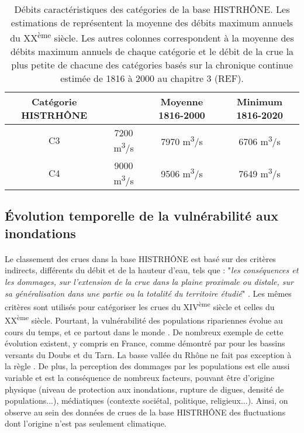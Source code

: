 \documentclass[11pt]{article}
\begin{document}
	\begin{table}[h]
	\centering
	\caption{Débits caractéristiques des catégories de la base HISTRHÔNE. Les estimations de \citet{pichard_hydro-climatology_2017} représentent la moyenne des débits maximum annuels du XX\textsuperscript{ème} siècle. Les autres colonnes correspondent à la moyenne des débits maximum annuels de chaque catégorie et le débit de la crue la plus petite de chacune des catégories basés sur la chronique continue estimée de 1816 à 2000 au chapitre 3 (REF).} 
	\label{tab:Qcateg}
		\begin{tabular}{|c|c|c|c|}
		\hline
		Catégorie HISTRHÔNE & \citet{pichard_hydro-climatology_2017} & Moyenne 1816-2000 & Minimum 1816-2020\\ \hline
		C3  & 7200 m\textsuperscript{3}/s  & 7970 m\textsuperscript{3}/s    & 6706 m\textsuperscript{3}/s   \\ \hline
		C4  & 9000 m\textsuperscript{3}/s  & 9506 m\textsuperscript{3}/s    & 7649 m\textsuperscript{3}/s   \\ \hline
		\end{tabular}
	\end{table}
	
	\subsection{Évolution temporelle de la vulnérabilité aux inondations}
	\label{subsec:EvolVuln}
	
	\paragraph{} Le classement des crues dans la base HISTRHÔNE est basé sur des critères indirects, différents du débit et de la hauteur d'eau, tels que : "\textit{les conséquences et les dommages, sur l'extension de la crue dans la plaine proximale ou distale, sur sa généralisation dans une partie ou la totalité du territoire étudié}" \citep{pichard_sept_2014}. Les mêmes critères sont utilisés pour catégoriser les crues du XIV\textsuperscript{ème} siècle et celles du XX\textsuperscript{ème} siècle. Pourtant, la vulnérabilité des populations ripariennes évolue au cours du temps, et ce partout dans le monde \citep{kron_flood_2002}. De nombreux exemple de cette évolution existent, y compris en France, comme démontré par \citet{boudou_assessing_2016} pour les bassins versants du Doubs et du Tarn. La basse vallée du Rhône ne fait pas exception à la règle \citep{piegay_observatoire_2022}. De plus, la perception des dommages par les populations est elle aussi variable et est la conséquence de nombreux facteurs, pouvant être d'origine physique (niveau de protection aux inondations, rupture de digues, densité de populations...), médiatiques (contexte sociétal, politique, religieux...). Ainsi, on observe au sein des données de crues de la base HISTRHÔNE des fluctuations dont l'origine n'est pas seulement climatique. 
	
\end{document}

